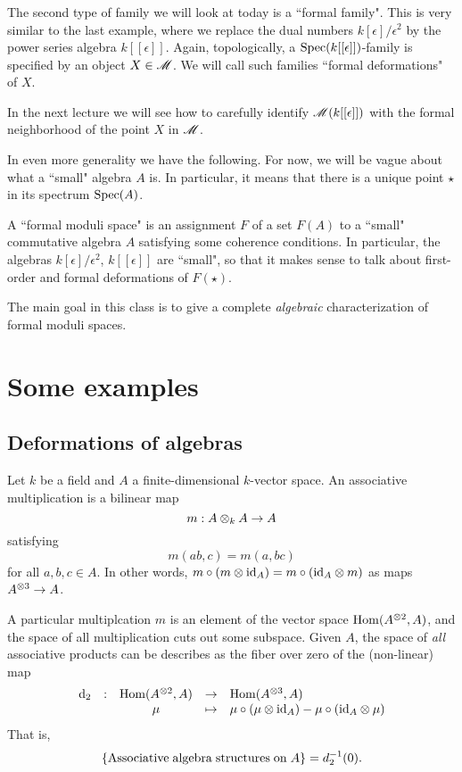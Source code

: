 \documentclass[11pt]{amsart}
\def\Spec{{\rm Spec}}
\begin{document}
\subsubsection{}

The second type of family we will look at today is a ``formal family". 
This is very similar to the last example, where we replace the dual numbers $k[\epsilon]/\epsilon^2$ by the power series algebra $k[[\epsilon]]$.
Again, topologically, a $\Spec(k[[\epsilon]])$-family is specified by an object $X \in \mathscr M$. 
We will call such families ``formal deformations" of $X$. 

\begin{rmk}
In the next lecture we will see how to carefully identify $\mathscr M(k[[\epsilon]])$ with the formal neighborhood of the point $X$ in $\mathscr M$. 
\end{rmk}

In even more generality we have the following.
For now, we will be vague about what a ``small" algebra $A$ is. 
In particular, it means that there is a unique point $\star$ in its spectrum $\Spec(A)$. 

\begin{vdfn} 
A ``formal moduli space" is an assignment $F$ of a set $F(A)$ to a ``small" commutative algebra $A$ satisfying some coherence conditions.
In particular, the algebras $k[\epsilon]/\epsilon^2$, $k[[\epsilon]]$ are ``small", so that it makes sense to talk about first-order and formal deformations of $F(\star)$.
\end{vdfn}

The main goal in this class is to give a complete {\em algebraic} characterization of formal moduli spaces. 

\section{Some examples}

\subsection{Deformations of algebras}

Let $k$ be a field and $A$ a finite-dimensional $k$-vector space. 
An associative multiplication is a bilinear map
\[
m : A \otimes_k A \to A
\]
satisfying 
\[
m(ab,c) = m(a,bc)
\]
for all $a,b,c \in A$. 
In other words, $m \circ (m \otimes {\rm id}_A) = m \circ ({\rm id}_A \otimes m)$ as maps $A^{\otimes 3} \to A$. 

A particular multiplcation $m$ is an element of the vector space ${\rm Hom}(A^{\otimes 2}, A)$, and the space of all multiplication cuts out some subspace. 
Given $A$, the space of {\em all} associative products can be describes as the fiber over zero of the (non-linear) map
\[
\begin{array}{ccccl}
{\rm d}_2 & : & {\rm Hom}(A^{\otimes 2}, A) & \to & {\rm Hom}(A^{\otimes 3}, A) \\
 & & \mu & \mapsto & \mu \circ (\mu \otimes {\rm id}_A) - \mu \circ ({\rm id}_A \otimes \mu)
\end{array}
\]
That is, 
\[
\{{\rm Associative\;algebra\;structures\;on\;}A\} = d_2^{-1}(0) .
\]
\end{document}

